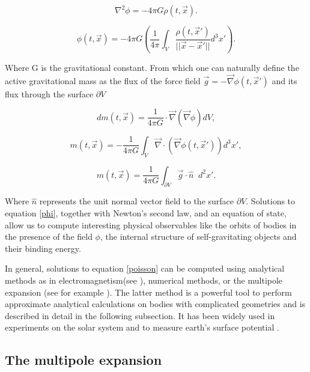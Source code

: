 \begin{equation}\label{poisson}
\nabla^2 \phi = -4\pi G \rho(t, \vec{x}).
\end{equation}

\begin{equation}\label{phi}
\phi(t, \vec{x}) = -4\pi G \left( \frac{1}{4\pi} \int_{V} \frac{\rho(t, \vec{x}')}{|| \vec{x}-\vec{x}' ||} d^3x'\right).
\end{equation}

Where G is the gravitational constant. From which one can naturally define the active gravitational mass as the flux of the force field $\vec{g}=-\vec{\nabla} \phi(t, \vec{x}')$ and its flux through the surface $\partial V$ 

\begin{equation}
dm(t, \vec{x}) = \frac{1}{4\pi G} \cdot \vec{\nabla}(\vec{\nabla}\phi) dV,
\end{equation}

\begin{equation}
m(t, \vec{x}) = -\frac{1}{4\pi G}\int_{V} \vec{\nabla} \cdot (\vec{\nabla} \phi(t, \vec{x}')) d^3 x' ,
\end{equation}

\begin{equation}\label{active mass}
m(t, \vec{x}) = \frac{1}{4\pi G}\int_{\partial V}  \vec{g}\cdot \hat{n}  \;\; d^2 x'.
\end{equation}


Where $\hat{n}$ represents the unit normal vector field to the surface $\partial V$. Solutions to equation \ref{phi}, together with Newton's second law, and an equation of state, allow us to compute interesting physical observables like the orbits of bodies in the presence of the field $\phi$, the internal structure of self-gravitating objects and their binding energy.


In general, solutions to equation \ref{poisson} can be computed using analytical methods as in electromagnetism(see \cite{Jackson:1998nia}), numerical methods, or the multipole expansion (see for example \cite{Thorne:1980ru}). The latter method is a powerful tool to perform approximate analytical calculations on bodies with complicated geometries and is described in detail in the following subsection. It has been widely used in experiments on the solar system and to measure earth's surface potential \cite{GOCE, GRACE}. 




\subsection{The multipole expansion}

